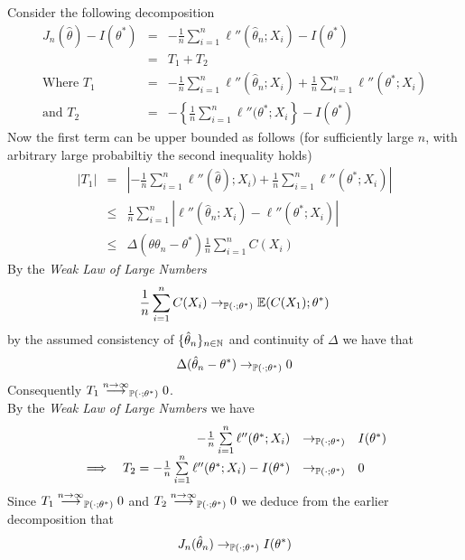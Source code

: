 \documentclass[11pt,a4paper]{article}
\begin{document}
Consider the following decomposition
\[\begin{array}{rcl}
J_n(\hat{\theta})-I(\theta^*)&=&-\frac{1}{n}\sum\limits_{i=1}^n\ell''(\hat{\theta}_n;X_i)-I(\theta^*)\\
&=&T_1+T_2\\
\text{Where }T_1&=&-\frac{1}{n}\sum\limits_{i=1}^n\ell''(\hat{\theta}_n;X_i)+\frac{1}{n}\sum\limits_{i=1}^n\ell''(\theta^*;X_i)\\
\text{and }T_2&=&-\left\{\frac{1}{n}\sum\limits_{i=1}^n\ell''(\theta^*;X_i\right\}-I(\theta^*)
\end{array}\]
Now the first term can be upper bounded as follows (for sufficiently large $n$, with arbitrary large probabiltiy the second inequality holds)
\[\begin{array}{rrl}
|T_1|&=&\left|-\frac{1}{n}\sum\limits_{i=1}^n\ell''(\hat{\theta});X_i)+\frac{1}{n}\sum\limits_{i=1}^n\ell''(\theta^*;X_i)\right|\\
&\leq&\frac{1}{n}\sum\limits_{i=1}^n\left|\ell''(\hat{\theta}_n;X_i)-\ell''(\theta^*;X_i)\right|\\
&\leq&\Delta(\theta{\theta}_n-\theta^*)\frac{1}{n}\sum\limits_{i=1}^nC(X_i)
\end{array}\]
By the \textit{Weak Law of Large Numbers}
$$\frac{1}{n}\sum_{i=1}^nC(X_i)\to_{\mathbb{P}(\cdot;\theta^*)}\mathbb{E}(C(X_1);\theta^*)$$
by the assumed consistency of $\{\hat{\theta}_n\}_{n\in\mathbb{N}}$ and continuity of $\Delta$ we have that
$$\Delta(\hat{\theta}_n-\theta^*)\to_{\mathbb{P}(\cdot;\theta^*)}0$$
Consequently $T_1\overset{n\to\infty}{\longrightarrow}_{\mathbb{P}(\cdot;\theta^*)}0$.\\
By the \textit{Weak Law of Large Numbers} we have
\[\begin{array}{rrrl}
&-\frac{1}{n}\sum\limits_{i=1}^n\ell''(\theta^*;X_i)&\to_{\mathbb{P}(\cdot;\theta^*)}&I(\theta^*)\\
\implies&T_2=-\frac{1}{n}\sum\limits_{i=1}^n\ell''(\theta^*;X_i)-I(\theta^*)&\to_{\mathbb{P}(\cdot;\theta^*)}&0
\end{array}\]
Since $T_1\overset{n\to\infty}{\longrightarrow}_{\mathbb{P}(\cdot;\theta^*)}0$ and $T_2\overset{n\to\infty}{\longrightarrow}_{\mathbb{P}(\cdot;\theta^*)}0$ we deduce from the earlier decomposition that
$$J_n(\hat{\theta}_n)\to_{\mathbb{P}(\cdot;\theta^*)}I(\theta^*)$$
\proved
\end{document}
